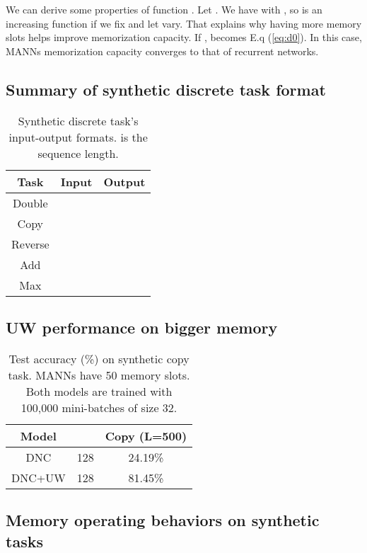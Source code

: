 We can derive some properties of function . Let .
We have 
with , so 
is an increasing function if we fix  and let  vary. That explains
why having more memory slots helps improve memorization capacity.
If ,  becomes E.q (\ref{eq:d0}).
In this case, MANNs memorization capacity converges to that of recurrent
networks.

\subsection{Summary of synthetic discrete task format\label{subsec:Summary-of-synthetic}}

\begin{table}[H]
\begin{centering}
\begin{tabular}{|c|c|c|}
\hline 
Task & Input & Output\tabularnewline
\hline 
\hline 
Double &  & \tabularnewline
\hline 
Copy &  & \tabularnewline
\hline 
Reverse &  & \tabularnewline
\hline 
Add &  & \tabularnewline
\hline 
Max &  & \tabularnewline
\hline 
\end{tabular}
\par\end{centering}
\caption{Synthetic discrete task's input-output formats.  is the sequence
length.}
\end{table}

\subsection{UW performance on bigger memory\label{subsec:UW-performance-on}}

\begin{table}[H]
\begin{centering}
\begin{tabular}{|c|c|c|}
\hline 
Model &  & Copy (L=500)\tabularnewline
\hline 
\hline 
DNC & 128 & 24.19\%\tabularnewline
\hline 
DNC+UW & 128 & 81.45\%\tabularnewline
\hline 
\end{tabular}
\par\end{centering}
\caption{Test accuracy (\%) on synthetic copy task. MANNs have 50 memory slots.
Both models are trained with 100,000 mini-batches of size 32.}

\end{table}

\subsection{Memory operating behaviors on synthetic tasks\label{subsec:Memory-writing-behaviours}}


